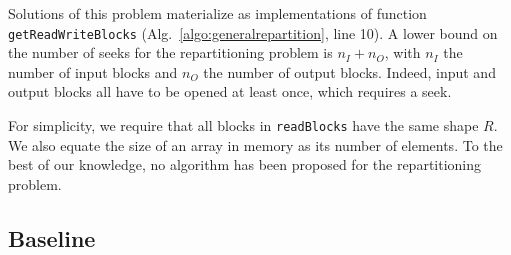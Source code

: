 \documentclass[sigconf, nonacm]{acmart}
\newcommand{\tristan}[1]{\fxnote{\small \color{red} \textbf{From Tristan:}#1} \color{black}}
\begin{document}

Solutions of this problem materialize as implementations of function
\texttt{getReadWriteBlocks} (Alg.~\ref{algo:generalrepartition}, line 10). A
lower bound on the number of seeks for the repartitioning problem is $n_I +
n_O$, with $n_I$ the number of input blocks and $n_O$ the number of output
blocks. Indeed, input and output blocks all have to be opened at least
once, which requires a seek.

For simplicity, we require that all blocks in \texttt{readBlocks} have the
same shape $R$. We also equate the size of an array in memory as its
number of elements. To the best of our knowledge, no algorithm has been
proposed for the repartitioning problem.


\subsection{Baseline}
\end{document}
